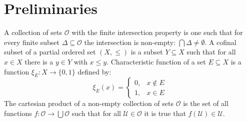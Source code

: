 \section{Preliminaries}
    A collection of sets $\mathcal{O}$ with the finite intersection property is
    one such that for every finite subset $\Delta\subseteq\mathcal{O}$ the
    intersection is non-empty: $\bigcap\Delta\ne\emptyset$. A cofinal subset of
    a partial ordered set $(X,\leq)$ is a subset $Y\subseteq{X}$ such that for
    all $x\in{X}$ there is a $y\in{Y}$ with $x\leq{y}$. Characteristic function
    of a set $E\subseteq{X}$ is a function $\xi_{E}:X\rightarrow\{0,1\}$ defined
    by:
    \begin{equation}
        \xi_{E}(x)=
        \begin{cases}
            0,&x\notin{E}\\
            1,&x\in{E}
        \end{cases}
    \end{equation}
    The cartesian product of a non-empty collection of sets $\mathcal{O}$ is the
    set of all functions $f:\mathcal{O}\rightarrow\bigcup\mathcal{O}$ such that
    for all $\mathcal{U}\in\mathcal{O}$ it is true that
    $f(\mathcal{U})\in\mathcal{U}$.
